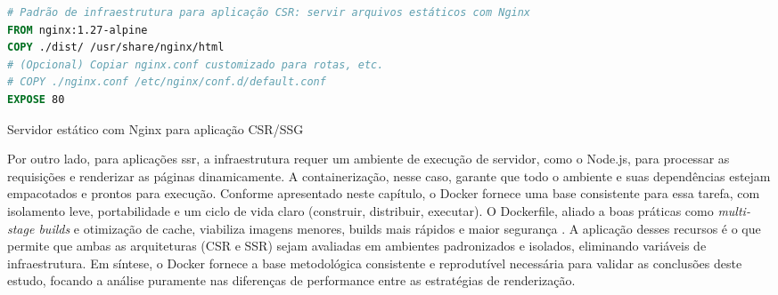 \begin{codigo}[H]
\begin{lstlisting}[language=Dockerfile]
# Padrão de infraestrutura para aplicação CSR: servir arquivos estáticos com Nginx
FROM nginx:1.27-alpine
COPY ./dist/ /usr/share/nginx/html
# (Opcional) Copiar nginx.conf customizado para rotas, etc.
# COPY ./nginx.conf /etc/nginx/conf.d/default.conf
EXPOSE 80
\end{lstlisting}
\caption{Servidor estático com Nginx para aplicação CSR/SSG}
\label{lst:dockerfile-nginx-static}
\end{codigo}

Por outro lado, para aplicações \acrshort{ssr}, a infraestrutura requer um ambiente de execução de servidor, como o Node.js, para processar as requisições e renderizar as páginas dinamicamente. A containerização, nesse caso, garante que todo o ambiente e suas dependências estejam empacotados e prontos para execução. Conforme apresentado neste capítulo, o Docker fornece uma base consistente para essa tarefa, com isolamento leve, portabilidade e um ciclo de vida claro (construir, distribuir, executar). O Dockerfile, aliado a boas práticas como \textit{multi-stage builds} e otimização de cache, viabiliza imagens menores, builds mais rápidos e maior segurança \cite{docker_overview,dockerfile_ref}. A aplicação desses recursos é o que permite que ambas as arquiteturas (CSR e SSR) sejam avaliadas em ambientes padronizados e isolados, eliminando variáveis de infraestrutura. Em síntese, o Docker fornece a base metodológica consistente e reprodutível necessária para validar as conclusões deste estudo, focando a análise puramente nas diferenças de performance entre as estratégias de renderização.